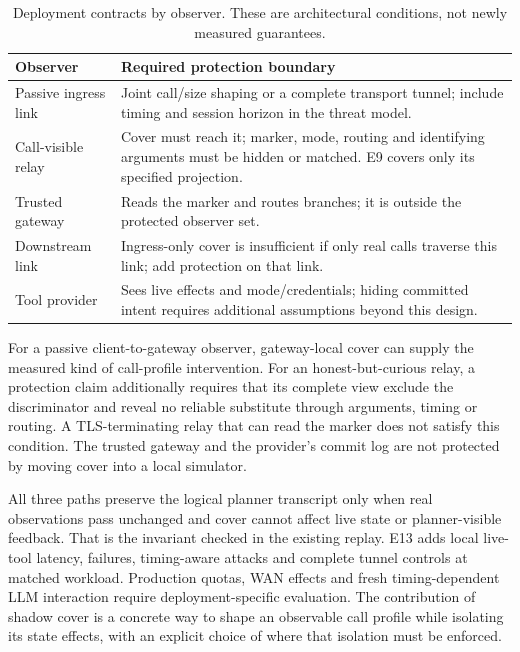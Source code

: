 \begin{table}[t]
\centering\footnotesize
\caption{Deployment contracts by observer. These are architectural conditions, not newly measured guarantees.}\label{tab:shadow-boundary}
\begin{tabularx}{\columnwidth}{@{}p{}Y@{}}
\toprule
Observer & Required protection boundary\\
\midrule
Passive ingress link & Joint call/size shaping or a complete transport tunnel; include timing and session horizon in the threat model.\\
Call-visible relay & Cover must reach it; marker, mode, routing and identifying arguments must be hidden or matched. E9 covers only its specified projection.\\
Trusted gateway & Reads the marker and routes branches; it is outside the protected observer set.\\
Downstream link & Ingress-only cover is insufficient if only real calls traverse this link; add protection on that link.\\
Tool provider & Sees live effects and mode/credentials; hiding committed intent requires additional assumptions beyond this design.\\
\bottomrule
\end{tabularx}
\end{table}

For a passive client-to-gateway observer, gateway-local cover can supply the measured kind of call-profile intervention. For an honest-but-curious relay, a protection claim additionally requires that its complete view exclude the discriminator and reveal no reliable substitute through arguments, timing or routing. A TLS-terminating relay that can read the marker does not satisfy this condition. The trusted gateway and the provider's commit log are not protected by moving cover into a local simulator.

All three paths preserve the logical planner transcript only when real observations pass unchanged and cover cannot affect live state or planner-visible feedback. That is the invariant checked in the existing replay. E13 adds local live-tool latency, failures, timing-aware attacks and complete tunnel controls at matched workload. Production quotas, WAN effects and fresh timing-dependent LLM interaction require deployment-specific evaluation. The contribution of shadow cover is a concrete way to shape an observable call profile while isolating its state effects, with an explicit choice of where that isolation must be enforced.
